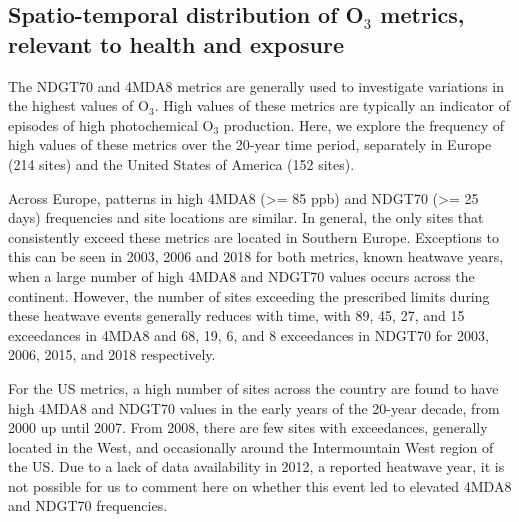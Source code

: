 \documentclass[journal abbreviation, manuscript]{copernicus}
\begin{document}

\subsection{Spatio-temporal distribution of O$_3$ metrics, relevant to health and exposure} \label{sect:metrics_distribution}

The NDGT70 and 4MDA8 metrics are generally used to investigate variations in the highest values of O$_3$. High values of these metrics are typically an indicator of episodes of high photochemical O$_3$ production. Here, we explore the frequency of high values of these metrics over the 20-year time period, separately in Europe (214 sites) and the United States of America (152 sites).

Across Europe, patterns in high 4MDA8 (>= 85 ppb) and NDGT70 (>= 25 days) frequencies and site locations are similar. In general, the only sites that consistently exceed these metrics are located in Southern Europe. Exceptions to this can be seen in 2003, 2006 and 2018 for both metrics, known heatwave years, when a large number of high 4MDA8 and NDGT70 values occurs across the continent. However, the number of sites exceeding the prescribed limits during these heatwave events generally reduces with time, with 89, 45, 27, and 15 exceedances in 4MDA8 and 68, 19, 6, and 8 exceedances in NDGT70 for 2003, 2006, 2015, and 2018 respectively.

For the US metrics, a high number of sites across the country are found to have high 4MDA8 and NDGT70 values in the early years of the 20-year decade, from 2000 up until 2007. From 2008, there are few sites with exceedances, generally located in the West, and occasionally around the Intermountain West region of the US. Due to a lack of data availability in 2012, a reported heatwave year, it is not possible for us to comment here on whether this event led to elevated 4MDA8 and NDGT70 frequencies. 
\end{document}
